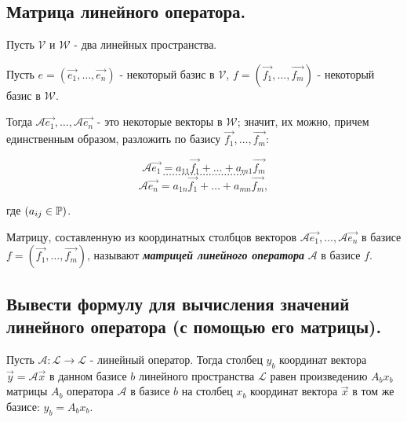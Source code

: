 \subsection{
    Матрица линейного оператора.
}

Пусть $\mathcal{V}$ и $\mathcal{W}$ - два линейных пространства.

Пусть $e = (\vec{e_1}, \ldots, \vec{e_n})$ - некоторый базис в $\mathcal{V}$, $f = (\vec{f_1}, \ldots, \vec{f_m})$ - некоторый базис в $\mathcal{W}$. 

Тогда $\mathscr{A}\vec{e_1}, \ldots, \mathscr{A}\vec{e_n}$ - это некоторые векторы в $\mathcal{W}$; значит, их можно, причем единственным образом, разложить по базису $\vec{f_1}, \ldots, \vec{f_m}$:

$$\mathscr{A}\vec{e_1} = a_{11}\vec{f_1} + \ldots + a_{m1}\vec{f_m}$$
$$\ldots \ldots \ldots \ldots \ldots \ldots \ldots \ldots \ldots$$
$$\mathscr{A}\vec{e_n} = a_{1n}\vec{f_1} + \ldots + a_{mn}\vec{f_m},$$

где $(a_{ij} \in \mathbb{P})$.

\begin{definition}
    Матрицу, составленную из координатных столбцов векторов $\mathscr{A}\vec{e_1}, \ldots, \mathscr{A}\vec{e_n}$ в базисе $f = (\vec{f_1}, \ldots, \vec{f_m})$, называют \textit{\textbf{матрицей линейного оператора}} $\mathscr{A}$ в базисе $f$.
\end{definition}


\newpage


\subsection{
    Вывести формулу для вычисления значений 
    линейного оператора (с помощью его 
    матрицы).
}

\begin{theorem}
    Пусть $\mathscr{A} \colon \mathcal{L} \to \mathcal{L}$ - линейный оператор. Тогда столбец $y_b$ координат вектора $\vec{y} = \mathscr{A}\vec{x}$ в данном базисе $b$ линейного пространства $\mathcal{L}$ равен произведению $A_bx_b$ матрицы $A_b$ оператора $\mathscr{A}$ в базисе $b$ на столбец $x_b$ координат вектора $\vec{x}$ в том же базисе: $y_b = A_bx_b$.
    \label{thm:theorem_21_1}
\end{theorem}

